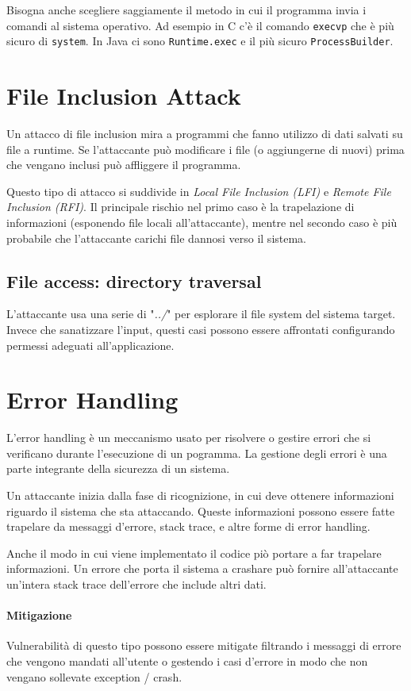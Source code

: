 \documentclass{article}
\begin{document}
Bisogna anche scegliere saggiamente il metodo in cui il programma invia i comandi al sistema operativo. Ad esempio in C c'è il comando \texttt{execvp} che è più sicuro di \texttt{system}. In Java ci sono \texttt{Runtime.exec} e il più sicuro \texttt{ProcessBuilder}.

\section{File Inclusion Attack}
Un attacco di file inclusion mira a programmi che fanno utilizzo di dati salvati su file a runtime. Se l'attaccante può modificare i file (o aggiungerne di nuovi) prima che vengano inclusi può affliggere il programma.

Questo tipo di attacco si suddivide in \textit{Local File Inclusion (LFI)} e \textit{Remote File Inclusion (RFI)}.
Il principale rischio nel primo caso è la trapelazione di informazioni (esponendo file locali all'attaccante), mentre nel secondo caso è più probabile che l'attaccante carichi file dannosi verso il sistema.

\subsection{File access: directory traversal}
L'attaccante usa una serie di "\textit{../}" per esplorare il file system del sistema target. \\
Invece che sanatizzare l'input, questi casi possono essere affrontati configurando permessi adeguati all'applicazione.

\section{Error Handling}
L'error handling è un meccanismo usato per risolvere o gestire errori che si verificano durante l'esecuzione di un pogramma. La gestione degli errori è una parte integrante della sicurezza di un sistema.

Un attaccante inizia dalla fase di ricognizione, in cui deve ottenere informazioni riguardo il sistema che sta attaccando. Queste informazioni possono essere fatte trapelare da messaggi d'errore, stack trace, e altre forme di error handling.

Anche il modo in cui viene implementato il codice piò portare a far trapelare informazioni. Un errore che porta il sistema a crashare può fornire all'attaccante un'intera stack trace dell'errore che include altri dati.

\paragraph{Mitigazione} Vulnerabilità di questo tipo possono essere mitigate filtrando i messaggi di errore che vengono mandati all'utente o gestendo i casi d'errore in modo che non vengano sollevate exception / crash.
\end{document}
